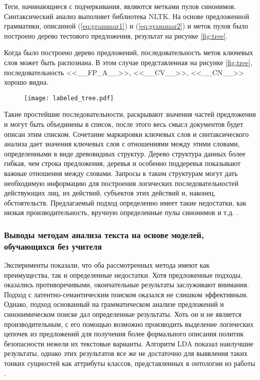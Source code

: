 \documentclass[../main]{subfiles}
\begin{document}
Теги, начинающиеся с подчеркивания, являются метками пулов синонимов. Синтаксический анализ выполняет библиотека NLTK. На основе предложенной грамматики, описанной (\ref{eq:grammar1}) и (\ref{eq:grammar2}) и меток пулов было построено дерево тестового предложения, результат на рисунке \ref{fig:tree}.

Когда было построено дерево предложений, последовательность меток ключевых слов может быть распознана. В этом случае представленная на рисунке \ref{fig:tree}, последовательность <<\_\_FP\_A\_\_>>, <<\_\_CV\_\_>>, <<\_\_CN\_\_>> хорошо видна.

\begin{figure}[H]
    \centering
    {\texttt{[image: labeled\_tree.pdf]}}
    \vspace{-\baselineskip}
\end{figure}

Такие простейшие последовательности, раскрывают значения частей предложения и могут быть объединены в список, после этого весь смысл документов будет описан этим списком. Сочетание маркировки ключевых слов и синтаксического анализа дает значения ключевых слов с отношениями между этими словами, определенными в виде древовидных структур. Дерево структура данных более гибкая, чем строка предложения, деревья и особенно поддеревья показывают важные отношения между словами. Запросы к таким структурам могут дать необходимую информацию для построения логических последовательностей действующих лиц, их действий, субъектов этих действий и, наконец, обстоятельств. Предлагаемый подход определенно имеет такие недостатки, как низкая производительность, вручную определенные пулы синонимов и т.д. \cite{LETI}.

\subsubsection{Выводы методам анализа текста на основе моделей, обучающихся без учителя}

Эксперименты показали, что оба рассмотренных метода имеют как преимущества, так и определенные недостатки. Хотя предложенные подходы, оказались противоречивыми, окончательные результаты заслуживают внимания. Подход с латентно-семантическим поиском оказался не слишком эффективным. Однако, подход основанный на грамматическом анализе предложений и синонимическом поиске дал определенные результаты. Хоть он и не является производительным, с его помощью возможно производить выделение логических цепочек из предложений для получения более формального описания политик безопасности нежели их текстовые варианты. Алгоритм LDA показал наилучшие результаты, однако этих результатов все же не достаточно для выявления таких тонких сущностей как аттрибуты классов, представленных в онтологии из работы \cite{P2Onto}.
\end{document}
